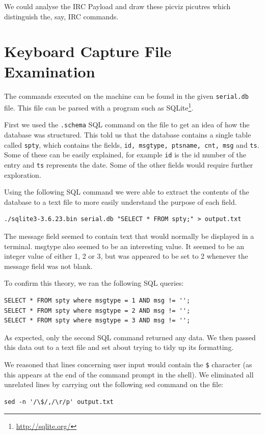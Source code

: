 \documentclass[a4paper,
    11pt,
    normalheadings,
    parindent,
    UKenglish,
    abstracton,
    ]{scrartcl}
\begin{document}
We could analyse the IRC Payload and draw these picviz picutres which distinguish the, say, IRC commands.


\section{Keyboard Capture File Examination}

The commands executed on the machine can be found in the given \texttt{serial.db} file.
This file can be parsed with a program such as SQLite\footnote{\url{http://sqlite.org/}}.

First we used the \texttt{.schema} SQL command on the file to get an idea of how the database was structured.
This told us that the database contains a single table called \texttt{spty}, which contains the fields, \texttt{id, msgtype, ptsname, cnt, msg} and \texttt{ts}.
Some of these can be easily explained, for example \texttt{id} is the id number of the entry and \texttt{ts} represents the date.
Some of the other fields would require further exploration.

Using the following SQL command we were able to extract the contents of the database to a text file to more easily understand the purpose of each field.

\begin{verbatim}
./sqlite3-3.6.23.bin serial.db "SELECT * FROM spty;" > output.txt
\end{verbatim}

The message field seemed to contain text that would normally be displayed in a terminal.
msgtype also seemed to be an interesting value.
It seemed to be an integer value of either 1, 2 or 3, but was appeared to be set to 2 whenever the message field was not blank.

To confirm this theory, we ran the following SQL queries:
\begin{verbatim}
SELECT * FROM spty where msgtype = 1 AND msg != '';
SELECT * FROM spty where msgtype = 2 AND msg != '';
SELECT * FROM spty where msgtype = 3 AND msg != '';
\end{verbatim}

As expected, only the second SQL command returned any data.
We then passed this data out to a text file and set about trying to tidy up its formatting.

We reasoned that lines concerning user input would contain the \texttt{\$} character (as this appears at the end of the command prompt in the shell).
We eliminated all unrelated lines by carrying out the following sed command on the file:
\begin{verbatim}
sed -n '/\$/,/\r/p' output.txt
\end{verbatim}
\end{document}
